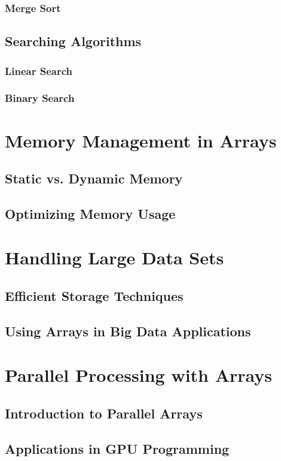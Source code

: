 \documentclass{book}
\begin{document}
	\subsubsection{Merge Sort}
	\subsection{Searching Algorithms}
	\subsubsection{Linear Search}
	\subsubsection{Binary Search}
	
	\section{Memory Management in Arrays}
	\subsection{Static vs. Dynamic Memory}
	\subsection{Optimizing Memory Usage}
	
	\section{Handling Large Data Sets}
	\subsection{Efficient Storage Techniques}
	\subsection{Using Arrays in Big Data Applications}
	
	\section{Parallel Processing with Arrays}
	\subsection{Introduction to Parallel Arrays}
	\subsection{Applications in GPU Programming}
	
\end{document}
